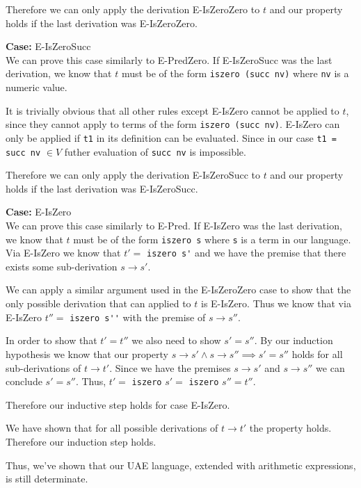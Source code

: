 \documentclass[12pt, fleqn]{article}
\begin{document}
\medskip
Therefore we can only apply the derivation E-IsZeroZero to $t$ and our property holds if the last derivation was E-IsZeroZero.

\medskip
\textbf{Case:} E-IsZeroSucc\\
We can prove this case similarly to E-PredZero. If E-IsZeroSucc was the last derivation, we know that $t$ must
be of the form \verb|iszero (succ nv)| where \verb|nv| is a numeric value.

\medskip
It is trivially obvious that all other rules except E-IsZero cannot be applied to $t$, since they cannot apply to
terms of the form \verb|iszero (succ nv)|. E-IsZero can only be applied if \verb|t1| in its definition can be evaluated. 
Since in our case \verb|t1 = succ nv| $\in V$ futher evaluation of \verb|succ nv| is impossible.

\medskip
Therefore we can only apply the derivation E-IsZeroSucc to $t$ and our property holds if the last derivation was E-IsZeroSucc.

\medskip
\textbf{Case:} E-IsZero\\
We can prove this case similarly to E-Pred.
If E-IsZero was the last derivation, we know that $t$ must be of the form \verb|iszero s| where \verb|s| is a term in our
language. Via E-IsZero we know that $t' = $ \verb|iszero s'| and we have the premise that there exists some sub-derivation $s \rightarrow s'$.

We can apply a similar argument used in the E-IsZeroZero case to show that the only possible derivation that can applied to $t$ is
E-IsZero. Thus we know that via E-IsZero $t'' =$ \verb|iszero s''| with the premise of $s \rightarrow s''$. 

In order to show that $t' = t''$ we also need to show $s' = s''$. By our induction hypothesis we know that our
property $s \rightarrow s' \land s \rightarrow s'' \implies s' = s''$ holds for all sub-derivations of $t \rightarrow t'$.
Since we have the premises $s \rightarrow s'$ and $s \rightarrow s''$ we can conclude $s' = s''$. 
Thus, $t' = $ \verb|iszero| $s' =$ \verb|iszero| $s'' = t''$.

Therefore our inductive step holds for case E-IsZero.

\medskip

We have shown that for all possible derivations of $t \rightarrow t'$ the property holds. 
Therefore our induction step holds.

\medskip

Thus, we've shown that our UAE language, extended with arithmetic expressions, is still determinate.
\end{document}
